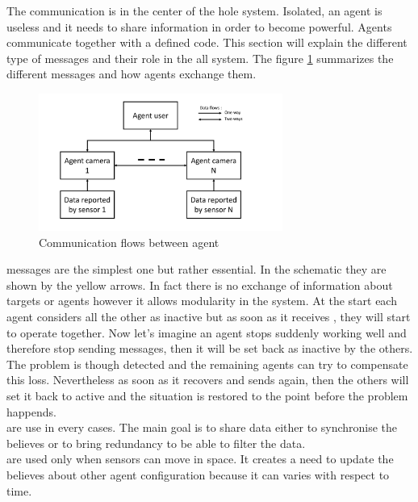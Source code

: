The communication is in the center of the hole system. Isolated, an agent is useless and it needs to share information in order to become powerful. Agents communicate together with a defined code. This section will explain the different type of messages and their role in the all system. The figure \ref{fig:communication_flows} summarizes the different messages and how agents exchange them.\\

\begin{figure}[h!]
    \centering
    \includegraphics[page=3,clip,width = 8cm]{systeme_multi_agent/conceptualization/multi_agent_schematic.pdf}
    \caption{Communication flows between agent}
    \label{fig:communication_flows}
\end{figure}

 messages are the simplest one but rather essential. In the schematic they are shown by the yellow arrows. In fact there is no exchange of information about targets or agents however it allows modularity in the system. At the start each agent considers all the other as inactive but as soon as it receives , they will start to operate together. Now let's imagine an agent stops suddenly working well and therefore stop sending messages, then it will be set back as inactive by the others. The problem is though detected and the remaining agents can try to compensate this loss. Nevertheless as soon as it recovers and sends  again, then the others will set it back to active and the situation is restored to the point before the problem happends.\\

 are use in every cases. The main goal is to share data either to synchronise the believes or to bring redundancy to be able to filter the data.\\

 are used only when sensors can move in space. It creates a need to update the believes about other agent configuration because it can varies with respect to time. 


